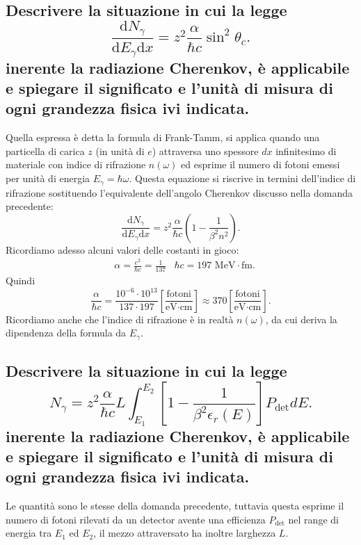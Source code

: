\subsection[ Situazioni di applicazione della formula di Frank-Tamm]{Descrivere la situazione in cui la legge 
\[
	\frac{\mbox{d} N_{\gamma}}{\mbox{d} E_{\gamma}\text{d}x} = z^2 \frac{\alpha}{\hbar c} \sin^2\theta_{c}
.\] 
inerente la radiazione Cherenkov, è applicabile e spiegare il significato e l'unità di misura di ogni grandezza fisica ivi indicata.
}\label{sec:4.a.7}
Quella espressa è detta la formula di Frank-Tamm, si applica quando una particella di carica $z$ (in unità di $e$) attraversa uno spessore $dx$ infinitesimo di materiale con indice di rifrazione $n\left( \omega \right)$ ed esprime il numero di fotoni emessi per unità di energia $E_{\gamma}= \hbar \omega$. 
Questa equazione si riscrive in termini dell'indice di rifrazione sostituendo l'equivalente dell'angolo Cherenkov discusso nella domanda precedente:
\[	
	\frac{\mbox{d} N_{\gamma}}{\mbox{d} E_{\gamma}\text{d}x} = z^2 \frac{\alpha}{\hbar c} \left( 1- \frac{1}{\beta^2 n^2} \right)  
.\] 
Ricordiamo adesso alcuni valori delle costanti in gioco:
\begin{align*}
	&\alpha = \frac{e^2}{\hbar c}= \frac{1}{137}	&\hbar c = 197 \text{ MeV}\cdot \text{fm}
.\end{align*}
Quindi \[
	\frac{\alpha}{\hbar c}= \frac{10^{-6}\cdot 10^{13}}{137\cdot 197} \left[ \frac{\text{fotoni}}{\text{eV}\cdot \text{cm}} \right] \approx 
	370 \left[ \frac{\text{fotoni}}{\text{eV}\cdot \text{cm}} \right]
.\] 
Ricordiamo anche che l'indice di rifrazione è in realtà $n\left( \omega \right) $, da cui deriva la dipendenza della formula da $E_{\gamma}$.

\subsection[ Situazioni di applicazione della formula di Frank-Tamm integrale]{Descrivere la situazione in cui la legge 
\[
	N_{\gamma}= z^2 \frac{\alpha}{\hbar c}L \int_{E_1}^{E_2} \left[ 1 - \frac{1}{\beta^2 \epsilon_{r}\left( E \right)}\right]P_{\text{det}}dE 	
.\] 
inerente la radiazione Cherenkov, è applicabile e spiegare il significato e l'unità di misura di ogni grandezza fisica ivi indicata.
}\label{sec:4.a.8}
Le quantità sono le stesse della domanda precedente, tuttavia questa esprime il numero di fotoni rilevati da un detector avente una efficienza $P_{\text{det}}$ nel range di energia tra $E_1$ ed $E_2$, il mezzo attraversato ha inoltre larghezza $L$.

